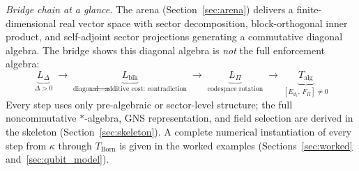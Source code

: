 \documentclass[11pt,a4paper]{article}
\theoremstyle{definition}
\begin{document}
\noindent\textit{Bridge chain at a glance.}  The arena (Section~\ref{sec:arena}) delivers a finite-dimensional real vector space with sector decomposition, block-orthogonal inner product, and self-adjoint sector projections generating a commutative diagonal algebra.  The bridge shows this diagonal algebra is \emph{not} the full enforcement algebra:
\[
\underbrace{L_\Delta}_{\Delta > 0} \;\to\; \underbrace{L_{\mathrm{blk}}}_{\text{diagonal} \Rightarrow \text{additive cost: contradiction}} \;\to\; \underbrace{L_\Pi}_{\text{codespace rotation}} \;\to\; \underbrace{T_{\mathrm{alg}}}_{[E_{d_1},\, F_\Pi] \ne 0}
\]
Every step uses only pre-algebraic or sector-level structure; the full noncommutative $*$-algebra, GNS representation, and field selection are derived in the skeleton (Section~\ref{sec:skeleton}).  A complete numerical instantiation of every step from $\kappa$ through $T_{\mathrm{Born}}$ is given in the worked examples (Sections~\ref{sec:worked} and~\ref{sec:qubit_model}).
\end{document}
